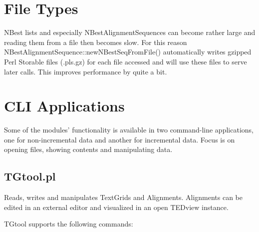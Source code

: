 \documentclass[a4,twoside=off,draft=true]{scrartcl}
\begin{document}
\section{File Types}


NBest lists and especially NBestAlignmentSequences can become rather large and reading
them from a file then becomes slow. For this reason NBestAlignmentSequence::newNBestSeqFromFile()
automatically writes gzipped Perl Storable files (.pls.gz) for each file accessed and will 
use these files to serve later calls. This improves performance by quite a bit.



\section{CLI Applications}

Some of the modules' functionality is available in two command-line applications, one
for non-incremental data and another for incremental data. Focus is on opening files, 
showing contents and manipulating data. 

\subsection{TGtool.pl}

Reads, writes and manipulates TextGrids and Alignments. Alignments can be edited in an 
external editor and visualized in an open TEDview instance.

TGtool supports the following commands:
\end{document}
